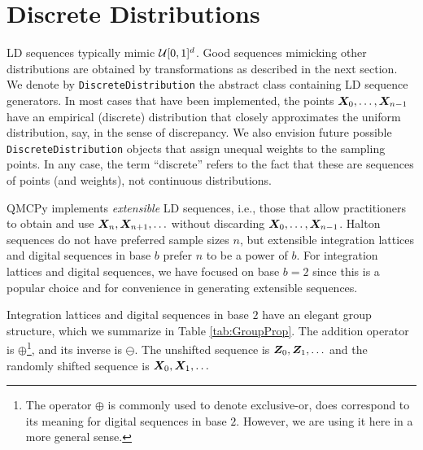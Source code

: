 \documentclass[graybox,footinfo]{svmult}
\begin{document}
\section{Discrete Distributions}

LD sequences typically mimic ${\mathcal{U}}[0,1]^d$.  Good sequences mimicking other distributions are obtained by transformations as described in the next section.  We denote by \texttt{DiscreteDistribution} the abstract class containing LD sequence generators.  In most cases that have been implemented, the points ${\boldsymbol{X}}_0, \ldots, {\boldsymbol{X}}_{n-1}$ have an empirical (discrete) distribution that closely approximates the uniform distribution, say, in the sense of discrepancy.  We also envision future possible \texttt{DiscreteDistribution} objects that assign unequal weights to the sampling points.  In any case, the term ``discrete'' refers to the fact that these are sequences of points (and weights), not continuous distributions.

QMCPy implements \emph{extensible} LD sequences, i.e., those that allow practitioners to obtain and use ${\boldsymbol{X}}_n, {\boldsymbol{X}}_{n+1}, \ldots $ without discarding ${\boldsymbol{X}}_0, \ldots, {\boldsymbol{X}}_{n-1}$.  Halton sequences do not have preferred sample sizes $n$, but extensible integration lattices and digital sequences in base $b$ prefer $n$ to be a power of $b$.  For integration lattices and digital sequences, we have focused on base $b=2$ since this is a popular choice and for convenience in generating extensible sequences.

Integration lattices and digital sequences in base $2$ have an elegant group structure, which we summarize in Table \ref{tab:GroupProp}.  The addition operator  is $\oplus$\footnote{The operator $\oplus$ is commonly used to denote exclusive-or, does correspond to its meaning for digital sequences in base $2$.  However, we are using it here in a more general sense.}, and its inverse is $\ominus$.  The unshifted sequence is ${\boldsymbol{Z}}_0, {\boldsymbol{Z}}_1, \ldots$ and the randomly shifted sequence is ${\boldsymbol{X}}_0, {\boldsymbol{X}}_1, \ldots$
\end{document}
